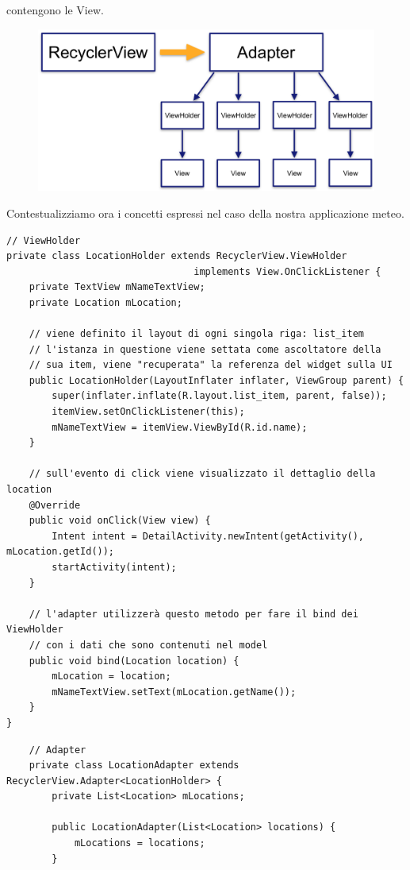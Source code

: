 \documentclass{article}
\begin{document}
\begin{itemize}
    contengono le View.
    \begin{figure}[H]
        \center
        \includegraphics[scale=0.28]{images/fig2.png}
    \end{figure}
    Contestualizziamo ora i concetti espressi nel caso della nostra applicazione meteo.
    \begin{lstlisting}
// ViewHolder
private class LocationHolder extends RecyclerView.ViewHolder
                                 implements View.OnClickListener {
    private TextView mNameTextView;
    private Location mLocation;

    // viene definito il layout di ogni singola riga: list_item
    // l'istanza in questione viene settata come ascoltatore della
    // sua item, viene "recuperata" la referenza del widget sulla UI
    public LocationHolder(LayoutInflater inflater, ViewGroup parent) {
        super(inflater.inflate(R.layout.list_item, parent, false));
        itemView.setOnClickListener(this);
        mNameTextView = itemView.ViewById(R.id.name);
    }

    // sull'evento di click viene visualizzato il dettaglio della location
    @Override
    public void onClick(View view) {
        Intent intent = DetailActivity.newIntent(getActivity(), mLocation.getId());
        startActivity(intent);
    }

    // l'adapter utilizzerà questo metodo per fare il bind dei ViewHolder
    // con i dati che sono contenuti nel model
    public void bind(Location location) {
        mLocation = location;
        mNameTextView.setText(mLocation.getName());
    }
}
    \end{lstlisting}
\begin{lstlisting}
    // Adapter
    private class LocationAdapter extends RecyclerView.Adapter<LocationHolder> {
        private List<Location> mLocations;

        public LocationAdapter(List<Location> locations) {
            mLocations = locations;
        }


\end{lstlisting}
\end{itemize}
\end{document}
